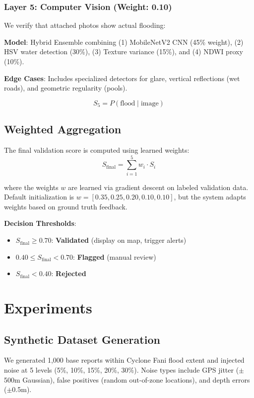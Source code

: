 \documentclass[conference]{IEEEtran}
\begin{document}
\subsubsection{Layer 5: Computer Vision (Weight: 0.10)}
We verify that attached photos show actual flooding:

\textbf{Model}: Hybrid Ensemble combining (1) MobileNetV2 CNN (45\% weight), (2) HSV water detection (30\%), (3) Texture variance (15\%), and (4) NDWI proxy (10\%).

\textbf{Edge Cases}: Includes specialized detectors for glare, vertical reflections (wet roads), and geometric regularity (pools).

\begin{equation}
S_5 = P(\text{flood} \mid \text{image})
\end{equation}

\subsection{Weighted Aggregation}

The final validation score is computed using learned weights:
\begin{equation}
S_{\text{final}} = \sum_{i=1}^{5} w_i \cdot S_i
\end{equation}

where the weights $w$ are learned via gradient descent on labeled validation data. Default initialization is $w = [0.35, 0.25, 0.20, 0.10, 0.10]$, but the system adapts weights based on ground truth feedback.

\textbf{Decision Thresholds}:
\begin{itemize}
    \item $S_{\text{final}} \geq 0.70$: \textbf{Validated} (display on map, trigger alerts)
    \item $0.40 \leq S_{\text{final}} < 0.70$: \textbf{Flagged} (manual review)
    \item $S_{\text{final}} < 0.40$: \textbf{Rejected}
\end{itemize}

\section{Experiments}
\label{sec:experiments}

\subsection{Synthetic Dataset Generation}
We generated 1,000 base reports within Cyclone Fani flood extent and injected noise at 5 levels (5\%, 10\%, 15\%, 20\%, 30\%). Noise types include GPS jitter ($\pm$500m Gaussian), false positives (random out-of-zone locations), and depth errors ($\pm$0.5m).
\end{document}
